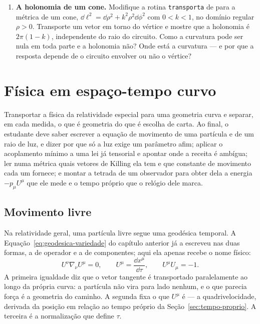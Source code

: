 \documentclass[12pt,a4paper,oneside]{book}
\theoremstyle{rgplain}
\theoremstyle{rgremark}
\begin{document}
\begin{enumerate}
  \item \textbf{A holonomia de um cone.} Modifique a rotina
\texttt{transporta} de  para a métrica de um cone,
$\dd\ell^2=\dd\rho^2+k^2\rho^2\dd\phi^2$ com $0<k<1$, no domínio regular
$\rho>0$. Transporte um vetor em torno do vértice e mostre que a holonomia é
$2\pi(1-k)$, independente do raio do circuito. Como a curvatura pode ser nula
em toda parte e a holonomia não? Onde está a curvatura --- e por que a resposta
depende de o circuito envolver ou não o vértice?
\end{enumerate}


\chapter{Física em espaço-tempo curvo}
\label{cap:fisica-curva}

\begin{objetivos}
Transportar a física da relatividade especial para uma geometria curva e
separar, em cada medida, o que é geometria do que é escolha de carta. Ao final,
o estudante deve saber escrever a equação de movimento de uma partícula e de um
raio de luz, e dizer por que só a luz exige um parâmetro afim; aplicar o
acoplamento mínimo a uma lei já tensorial e apontar onde a receita é ambígua;
ler numa métrica quais vetores de Killing ela tem e que constante de movimento
cada um fornece; e montar a tetrada de um observador para obter dela a energia
$-p_\mu U^\mu$ que ele mede e o tempo próprio que o relógio dele marca.
\end{objetivos}

\section{Movimento livre}
\label{sec:movimento-livre}

Na relatividade geral, uma partícula livre segue uma geodésica temporal. A
Equação~\eqref{eq:geodesica-variedade} do capítulo anterior já a escreveu nas
duas formas, a de operador e a de componentes; aqui ela apenas recebe o nome
físico:
\begin{equation}
  U^\nu\nabla_\nu U^\mu=0 ,
  \qquad
  U^\mu=\frac{\dd x^\mu}{\dd\tau} ,
  \qquad
  U^\mu U_\mu=-1 .
  \label{eq:geodesica-massiva}
\end{equation}
A primeira igualdade diz que o vetor tangente é transportado paralelamente ao
longo da própria curva: a partícula não vira para lado nenhum, e o que parecia
força é a geometria do caminho. A segunda fixa o que $U^\mu$ é --- a
quadrivelocidade, derivada da posição em relação ao tempo próprio da
Seção~\ref{sec:tempo-proprio}. A terceira é a normalização que define $\tau$.
\end{document}

